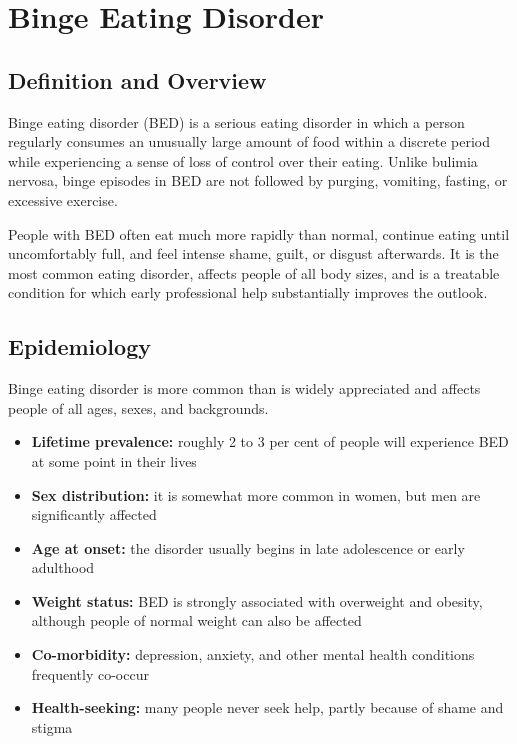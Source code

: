 \chapter{Binge Eating Disorder}

\section*{Definition and Overview}
Binge eating disorder (BED) is a serious eating disorder in which a person regularly consumes an unusually large amount of food within a discrete period while experiencing a sense of loss of control over their eating. Unlike bulimia nervosa, binge episodes in BED are not followed by purging, vomiting, fasting, or excessive exercise.

People with BED often eat much more rapidly than normal, continue eating until uncomfortably full, and feel intense shame, guilt, or disgust afterwards. It is the most common eating disorder, affects people of all body sizes, and is a treatable condition for which early professional help substantially improves the outlook.

\section*{Epidemiology}
Binge eating disorder is more common than is widely appreciated and affects people of all ages, sexes, and backgrounds.

\begin{itemize}
    \item \textbf{Lifetime prevalence:} roughly 2 to 3 per cent of people will experience BED at some point in their lives
    \item \textbf{Sex distribution:} it is somewhat more common in women, but men are significantly affected
    \item \textbf{Age at onset:} the disorder usually begins in late adolescence or early adulthood
    \item \textbf{Weight status:} BED is strongly associated with overweight and obesity, although people of normal weight can also be affected
    \item \textbf{Co-morbidity:} depression, anxiety, and other mental health conditions frequently co-occur
    \item \textbf{Health-seeking:} many people never seek help, partly because of shame and stigma
\end{itemize}

